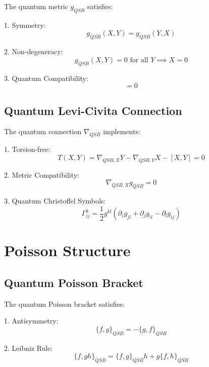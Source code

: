 \documentclass[12pt]{article}
\begin{document}
The quantum metric $g_{QSB}$ satisfies:

1. Symmetry:
\begin{equation}
g_{QSB}(X,Y) = g_{QSB}(Y,X)
\end{equation}

2. Non-degeneracy:
\begin{equation}
g_{QSB}(X,Y) = 0 \text{ for all } Y \implies X = 0
\end{equation}

3. Quantum Compatibility:
\begin{equation}
[g_{QSB}, H_{QSB}] = 0
\end{equation}

\subsection{Quantum Levi-Civita Connection}

The quantum connection $\nabla_{QSB}$ implements:

1. Torsion-free:
\begin{equation}
T(X,Y) = \nabla_{QSB,X}Y - \nabla_{QSB,Y}X - [X,Y] = 0
\end{equation}

2. Metric Compatibility:
\begin{equation}
\nabla_{QSB,X}g_{QSB} = 0
\end{equation}

3. Quantum Christoffel Symbols:
\begin{equation}
Γ^k_{ij} = \frac{1}{2}g^{kl}(\partial_ig_{jl} + \partial_jg_{il} - \partial_lg_{ij})
\end{equation}

\section{Poisson Structure}

\subsection{Quantum Poisson Bracket}

The quantum Poisson bracket satisfies:

1. Antisymmetry:
\begin{equation}
\{f,g\}_{QSB} = -\{g,f\}_{QSB}
\end{equation}

2. Leibniz Rule:
\begin{equation}
\{f,gh\}_{QSB} = \{f,g\}_{QSB}h + g\{f,h\}_{QSB}
\end{equation}
\end{document}
